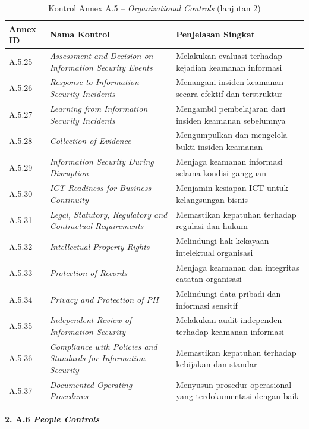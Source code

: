\begin{table}[H]
\centering
\small
\caption{Kontrol Annex A.5 -- \textit{Organizational Controls} (lanjutan 2) \cite{isoiec20227001}}
\label{tab:annex_a5_lanjutan2}
\begin{tabular}{|P{1.6cm}|P{5.0cm}|P{6.4cm}|}
\hline
\textbf{Annex ID} & \textbf{Nama Kontrol} & \textbf{Penjelasan Singkat} \\
\hline
A.5.25 & \textit{Assessment and Decision on Information Security Events}         & Melakukan evaluasi terhadap kejadian keamanan informasi \\
\hline
A.5.26 & \textit{Response to Information Security Incidents}                     & Menangani insiden keamanan secara efektif dan terstruktur \\
\hline
A.5.27 & \textit{Learning from Information Security Incidents}                   & Mengambil pembelajaran dari insiden keamanan sebelumnya \\
\hline
A.5.28 & \textit{Collection of Evidence}                                         & Mengumpulkan dan mengelola bukti insiden keamanan \\
\hline
A.5.29 & \textit{Information Security During Disruption}                         & Menjaga keamanan informasi selama kondisi gangguan \\
\hline
A.5.30 & \textit{ICT Readiness for Business Continuity}                          & Menjamin kesiapan ICT untuk kelangsungan bisnis \\
\hline
A.5.31 & \textit{Legal, Statutory, Regulatory and Contractual Requirements}      & Memastikan kepatuhan terhadap regulasi dan hukum \\
\hline
A.5.32 & \textit{Intellectual Property Rights}                                   & Melindungi hak kekayaan intelektual organisasi \\
\hline
A.5.33 & \textit{Protection of Records}                                          & Menjaga keamanan dan integritas catatan organisasi \\
\hline
A.5.34 & \textit{Privacy and Protection of PII}                                  & Melindungi data pribadi dan informasi sensitif \\
\hline
A.5.35 & \textit{Independent Review of Information Security}                     & Melakukan audit independen terhadap keamanan informasi \\
\hline
A.5.36 & \textit{Compliance with Policies and Standards for Information Security} & Memastikan kepatuhan terhadap kebijakan dan standar \\
\hline
A.5.37 & \textit{Documented Operating Procedures}                                & Menyusun prosedur operasional yang terdokumentasi dengan baik \\
\hline
\end{tabular}
\end{table}
\vspace{4pt}
\noindent\textbf{2. A.6 \textit{People Controls}}

